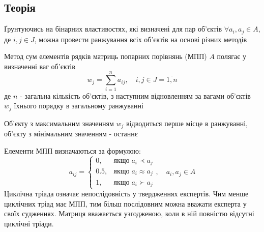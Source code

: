 \subsection{Теорія}
\label{subsec:sum/theory}

\begin{large}
    Ґрунтуючись на бінарних властивостях, які визначені
    для пар об'єктів $\forall a_i, a_j \in A$, де $i, j \in J$,
    можна провести ранжування всіх об'єктів на основі різних методів

    Метод сум елементів рядків матриць попарних порівнянь (МПП) $A$
    полягає у визначенні ваг об'єктів
    \begin{equation}
        \label{eq:sum_of_rows}
        w_j = \sum_{i=1}^n a_{ij},
        \quad i, j \in J = \overline{1, n}
    \end{equation}
    де $n$ - загальна кількість об'єктів,
    з наступним відновленням за вагами об'єктів $w_j$
    їхнього порядку в загальному ранжуванні

    Об'єкту з максимальним значенням $w_j$
    відводиться перше місце в ранжуванні,
    об'єкту з мінімальним значенням - останнє

    Елементи МПП визначаються за формулою:
    \begin{equation}
        \label{eq:pairwise_matrix}
        a_{ij} =
        \begin{cases}
            0,
            & \text{якщо}
            \; a_i \prec a_j \\

            0.5,
            & \text{якщо}
            \; a_i \approx a_j \\

            1,
            & \text{якщо}
            \; a_i \succ a_j
        \end{cases},
        \quad a_i, a_j \in A
    \end{equation}
    Циклічна тріада означає непослідовність у твердженнях експертів.
    Чим менше циклічних тріад має МПП,
    тим більш послідовним можна вважати
    експерта у своїх судженнях.
    Матриця вважається узгодженою,
    коли в ній повністю відсутні циклічні тріади.
\end{large}
